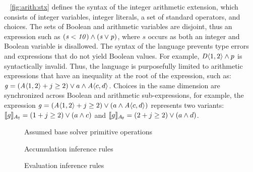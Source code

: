 ~\label{section:vsmt:primitives}
%
\autoref{fig:arith:stx} defines the syntax of the integer arithmetic extension,
which consists of integer variables, integer literals, a set of standard
operators, and choices.
%
The sets of Boolean and arithmetic variables are disjoint, thus an expression
such as $(\mathit{s < 10) \wedge (s \vee p})$, where $s$ occurs as both an integer
and Boolean variable is disallowed.
%
The syntax of the language prevents type errors and expressions that do not
yield Boolean values. For example, $\chc[D]{1,2} \wedge p$ is syntactically
invalid.
%
Thus, the language is purposefully limited to arithmetic expressions that
have an inequality at the root of the expression, such as: $\kf{g} =
(\chc[A]{1, 2} + j \geq 2) \vee a \wedge \chc[A]{c, d}$.
%
Choices in the same dimension are synchronized across Boolean and arithmetic
sub-expressions, for example, the expression
%
$\kf{g} = (\chc[A]{1, 2} + j \geq 2) \vee (a \wedge \chc[A]{c,d})$
represents two variants:
%
$\sem[A_{\tru{}}]{g} = (1 + j \geq 2) \vee (a \wedge c)$ and
$\sem[A_{\fls{}}]{g} = (2 + j \geq 2) \vee (a \wedge d)$.

\begin{figure}
  
  \caption{Assumed base solver primitive operations}%
  \label{fig:vsmt:inf:prim}
\end{figure}
%
\begin{figure}
  
  \caption{Accumulation inference rules}%
  \label{fig:vsmt:inf:acc}
\end{figure}
%
\begin{figure}
  
  \caption{Evaluation inference rules}%
  \label{fig:vsmt:inf:eval}
\end{figure}
%
